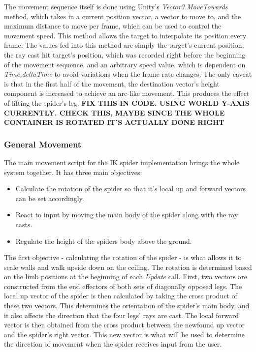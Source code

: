 The movement sequence itself is done using Unity's \textit{Vector3.MoveTowards}
method, which takes in a current position vector, a vector to move to, and the
maximum distance to move per frame, which can be used to control the movement
speed. This method allows the target to interpolate its position every frame.
The values fed into this method are simply the target's current position, the
ray cast hit target's position, which was recorded right before the beginning of
the movement sequence, and an arbitrary speed value, which is dependent on
\textit{Time.deltaTime} to avoid variations when the frame rate changes. The
only caveat is that in the first half of the movement, the destination vector's
height component is increased to achieve an arc-like movement. This produces the
effect of lifting the spider's leg. \textbf{FIX THIS IN CODE. USING WORLD Y-AXIS
CURRENTLY. CHECK THIS, MAYBE SINCE THE WHOLE CONTAINER IS ROTATED IT'S ACTUALLY
DONE RIGHT}

\subsubsection{General Movement}
The main movement script for the IK spider implementation brings the whole
system together. It has three main objectives:

\begin{itemize}

    \item Calculate the rotation of the spider so that it's local up and forward
        vectors can be set accordingly.

    \item React to input by moving the main body of the spider along with the
        ray casts.

    \item Regulate the height of the spiders body above the ground.

\end{itemize}

The first objective - calculating the rotation of the spider - is what allows it
to scale walls and walk upside down on the ceiling. The rotation is determined
based on the limb positions at the beginning of each \textit{Update} call.
First, two vectors are constructed from the end effectors of both sets of
diagonally opposed legs. The local up vector of the spider is then calculated by
taking the cross product of these two vectors. This determines the orientation
of the spider's main body, and it also affects the direction that the four legs'
rays are cast. The local forward vector is then obtained from the cross product
between the newfound up vector and the spider's right vector. This new vector is
what will be used to determine the direction of movement when the spider
receives input from the user.

